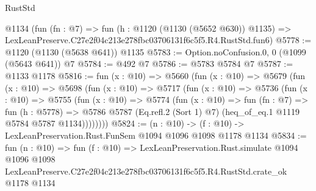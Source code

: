 \begin{lexlean}{RustStd}
\begin{coremodule}
    @1134
    (fun (fn : @7) =>
    fun (h : @1120 (@1130 (@5652 @630)) @1135) =>
    LexLeanPreserve.C27e2f04c213e278fbc03706131f6c5f5.R4.RustStd.fun6)
@5778 := @1120 (@1130 (@5638 @641)) @1135
@5783 := Option.noConfusion.{0, 0} (@1099 (@5643 @641)) @7
@5784 := @492 @7
@5786 := @5783 @5784 @7
@5787 := @1133 @1178
@5816 := fun (x : @10) =>
  @5660
    (fun (x : @10) =>
    @5679
      (fun (x : @10) =>
      @5698
        (fun (x : @10) =>
        @5717
          (fun (x : @10) =>
          @5736
            (fun (x : @10) =>
            @5755
              (fun (x : @10) =>
              @5774
                (fun (x : @10) =>
                fun (fn : @7) =>
                fun (h : @5778) =>
                @5786 @5787 (Eq.refl.{2} (Sort 1) @7) (heq_of_eq.{1} @1119 @5784 @5787 @1134))))))))
@5824 := (n : @10) -> (f : @10) -> LexLeanPreservation.Rust.FunSem @1094 @1096 @1098 @1178 @1134
@5834 := fun (n : @10) =>
  fun (f : @10) =>
  LexLeanPreservation.Rust.simulate
    @1094
    @1096
    @1098
    LexLeanPreserve.C27e2f04c213e278fbc03706131f6c5f5.R4.RustStd.crate_ok
    @1178
    @1134
\end{coremodule}
\end{lexlean}
